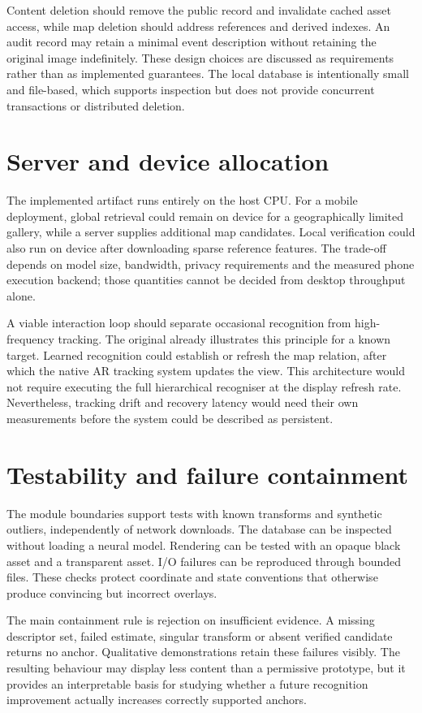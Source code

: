 Content deletion should remove the public record and invalidate cached asset access, while map deletion should address references and derived indexes. An audit record may retain a minimal event description without retaining the original image indefinitely. These design choices are discussed as requirements rather than as implemented guarantees. The local database is intentionally small and file-based, which supports inspection but does not provide concurrent transactions or distributed deletion.
\fi

\section{Server and device allocation}
The implemented artifact runs entirely on the host CPU. For a mobile deployment, global retrieval could remain on device for a geographically limited gallery, while a server supplies additional map candidates. Local verification could also run on device after downloading sparse reference features. The trade-off depends on model size, bandwidth, privacy requirements and the measured phone execution backend; those quantities cannot be decided from desktop throughput alone.

A viable interaction loop should separate occasional recognition from high-frequency tracking. The original  already illustrates this principle for a known target. Learned recognition could establish or refresh the map relation, after which the native AR tracking system updates the view. This architecture would not require executing the full hierarchical recogniser at the display refresh rate. Nevertheless, tracking drift and recovery latency would need their own measurements before the system could be described as persistent.

\section{Testability and failure containment}
The module boundaries support tests with known transforms and synthetic outliers, independently of network downloads. The database can be inspected without loading a neural model. Rendering can be tested with an opaque black asset and a transparent asset. I/O failures can be reproduced through bounded files. These checks protect coordinate and state conventions that otherwise produce convincing but incorrect overlays.

The main containment rule is rejection on insufficient evidence. A missing descriptor set, failed estimate, singular transform or absent verified candidate returns no anchor. Qualitative demonstrations retain these failures visibly. The resulting behaviour may display less content than a permissive prototype, but it provides an interpretable basis for studying whether a future recognition improvement actually increases correctly supported anchors.
